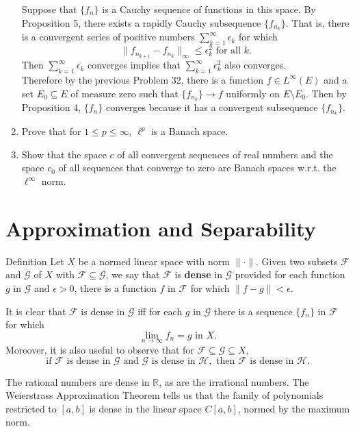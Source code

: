 \begin{enumerate}
	Suppose that $\{f_n\}$ is a Cauchy sequence of functions in this space.
	By Proposition 5, there exists a rapidly Cauchy subsequence $\{f_{n_k}\}$.
	That is, there is a convergent series of positive numbers $\sum_{k=1}^\infty\epsilon_k$ for which
	\[
		\|f_{n_{k+1}}-f_{n_k}\|_{\infty}\le\epsilon_k^2\text{ for all }k.
	\]
	Then $\sum_{k=1}^\infty\epsilon_k$ converges implies that $\sum_{k=1}^\infty\epsilon_k^2$ also converges.
	\\Therefore by the previous Problem 32, there is a function $f\in L^\infty(E)$ and a set $E_0\subseteq E$ of measure zero such that $\{f_{n_k}\}\to f$ uniformly on $E\setminus E_0$.
	Then by Proposition 4, $\{f_n\}$ converges because it has a convergent subsequence $\{f_{n_k}\}$. 
	\item Prove that for $1\le p\le\infty$, $\ell^p$ is a Banach space.
	\item Show that the space $c$ of all convergent sequences of real numbers and the space $c_0$ of all sequences that converge to zero are Banach spaces w.r.t. the $\ell^\infty$ norm. 
\end{enumerate}

\section{Approximation and Separability}

\begin{namedthm*}{Definition}
	Let $X$ be a normed linear space with norm $\|\cdot\|$.
	Given two subsets $\mathcal{F}$ and $\mathcal{G}$ of $X$ with $\mathcal{F}\subseteq\mathcal{G}$, we say that $\mathcal{F}$ is \textbf{dense} in $\mathcal{G}$ provided for each function $g$ in $\mathcal{G}$ and $\epsilon>0$, there is a function $f$ in $\mathcal{F}$ for which $\|f-g\|<\epsilon$.
\end{namedthm*}
It is clear that $\mathcal{F}$ is dense in $\mathcal{G}$ iff for each $g$ in $\mathcal{G}$ there is a sequence $\{f_n\}$ in $\mathcal{F}$ for which 
\[
	\lim_{n\to\infty}f_n=g\text{ in }X.
\]	
Moreover, it is also useful to observe that for $\mathcal{F}\subseteq\mathcal{G}\subseteq X$,
\[
	\text{if }\mathcal{F}\text{ is dense in }\mathcal{G}\text{ and }\mathcal{G}\text{ is dense in }\mathcal{H},\text{ then }\mathcal{F}\text{ is dense in }\mathcal{H}.
\]

The rational numbers are dense in $\mathbb{R}$, as are the irrational numbers.
The Weierstrass Approximation Theorem tells us that the family of polynomials restricted to $[a,b]$ is dense in the linear space $C[a,b]$, normed by the maximum norm.


